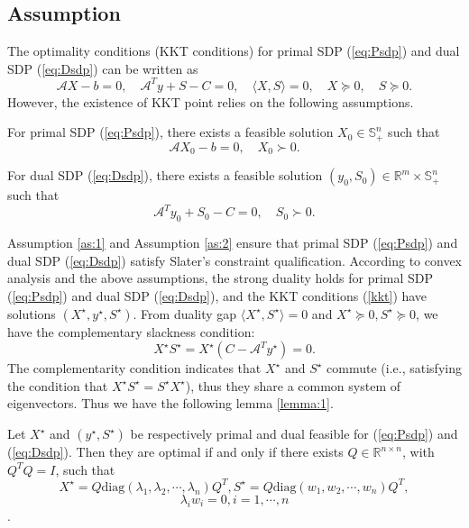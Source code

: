 \documentclass{jcmlatex}
\begin{document}
\subsection{Assumption}
The optimality conditions (KKT conditions) for primal SDP (\ref{eq:Psdp}) and dual SDP (\ref{eq:Dsdp}) can be written as
\begin{equation}\label{kkt}
\mathcal{A}X-b=0,\quad\mathcal{A}^{T}y+S-C=0,\quad\langle X,S \rangle=0,\quad X\succeq0,\quad S\succeq0.
\end{equation}
However, the existence‌ of KKT point relies on the following assumptions.
\begin{assumption}\label{as:1}
For primal SDP (\ref{eq:Psdp}), there exists a feasible solution $X_{0} \in \mathbb{S}^{n}_{+}$ such that
\begin{equation*}
\mathcal{A}X_{0}-b=0,\quad X_{0}\succ0.
\end{equation*}
\end{assumption}
\begin{assumption}\label{as:2}
For dual SDP (\ref{eq:Dsdp}), there exists a feasible solution $(y_{0}, S_{0})\in \mathbb{R}^{m}\times \mathbb{S}^{n}_{+}$ such that
\begin{equation*}
\mathcal{A}^{T}y_{0}+S_{0}-C=0,\quad S_{0}\succ0.
\end{equation*}
\end{assumption}
Assumption \ref{as:1} and Assumption \ref{as:2} ensure that primal SDP (\ref{eq:Psdp}) and dual SDP (\ref{eq:Dsdp}) satisfy Slater’s constraint qualification. According to convex analysis\cite{borwein2006convex} and the above assumptions, the strong duality holds for primal SDP (\ref{eq:Psdp}) and dual SDP (\ref{eq:Dsdp}), and the KKT conditions (\ref{kkt}) have solutions \((X^{\star},y^{\star},S^{\star})\). From duality gap \(\langle X^{\star},S^{\star} \rangle=0\) and \(X^{\star}\succeq0,S^{\star}\succeq0\), we have the complementary slackness condition:
\begin{equation*}
X^{\star}S^{\star}=X^{\star}(C-\mathcal{A}^{T}y^{\star})=0.
\end{equation*}
The complementarity condition indicates that \( X^{\star}\) and \( S^{\star}\) commute (i.e., satisfying the condition that \( X^{\star}S^{\star} = S^{\star}X^{\star}\)), thus they share a common system of eigenvectors. Thus we have the following lemma \ref{lemma:1}\cite{alizadeh1997complementarity}.
\begin{lemma}\label{lemma:1}
Let \( X^{\star}\) and \((y^{\star},S^{\star})\) be respectively primal and dual feasible for (\ref{eq:Psdp}) and (\ref{eq:Dsdp}). Then they are optimal if and only if there exists \(Q\in \mathbb{R}^{n \times n}\), with \(Q^{T}Q = I\), such that
\begin{equation*}
X^{\star}=Q\text{diag}(\lambda_{1},\lambda_{2},\cdots,\lambda_{n})Q^{T},
S^{\star}=Q\text{diag}(w_{1},w_{2},\cdots,w_{n})Q^{T},
\end{equation*}
\begin{equation}\label{eq:cs}
\lambda_{i}w_{i}=0,i=1,\cdots,n
\end{equation}
.
\end{lemma}
\end{document}
